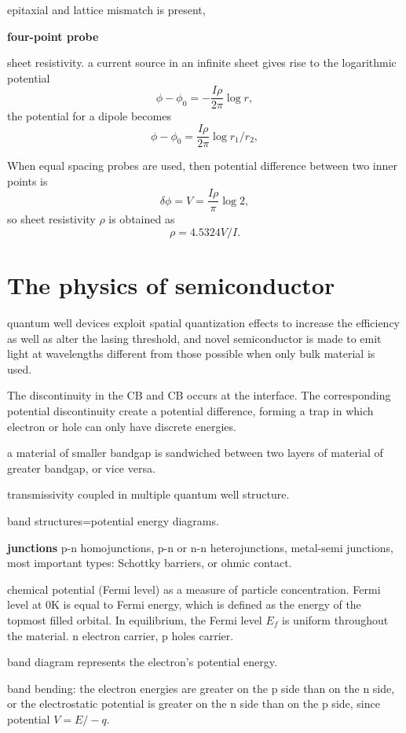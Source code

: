 epitaxial and lattice mismatch is present, 

\textbf{four-point probe}

sheet resistivity. a current source in an infinite sheet gives rise to the logarithmic potential
\[
\phi - \phi_0 = - \frac{I\rho}{2\pi}\log r,
\]
the potential for a dipole becomes
\[
\phi - \phi_0 = \frac{I\rho}{2\pi}\log r_1/r_2,
\]

When equal spacing probes are used, then potential difference between two inner points is 
\[
\delta\phi = V = \frac{I \rho}{\pi}\log2,
\]
so sheet resistivity $\rho$ is obtained as
\[
\rho = 4.5324V/I.
\]




\section{The physics of semiconductor}


quantum well devices exploit spatial quantization effects to increase the efficiency as well as alter the lasing threshold, and  novel semiconductor is made to emit light at wavelengths different from those possible when only bulk material is used.


The discontinuity in the CB and CB occurs at the interface. The corresponding potential discontinuity create a potential difference, forming a trap in which electron or hole can only have discrete energies.

a material of smaller bandgap is sandwiched between two layers of material of greater bandgap, or vice versa.

transmissivity coupled in multiple quantum well structure.

band structures=potential energy diagrams.

\textbf{junctions}
p-n homojunctions, p-n or n-n heterojunctions, metal-semi junctions, most important types: Schottky barriers, or ohmic contact.

chemical potential (Fermi level) as a measure of particle concentration.  Fermi level at 0K is equal to Fermi energy, which is defined as the energy of the topmost filled orbital. In equilibrium, the Fermi level $E_f$ is uniform throughout the material. n electron carrier, p holes carrier.

band diagram represents the electron's potential energy.

band bending: the electron energies are greater on the p side than on the n side, or the electrostatic potential is greater on the n side than on the p side, since potential $V = E/-q$.

